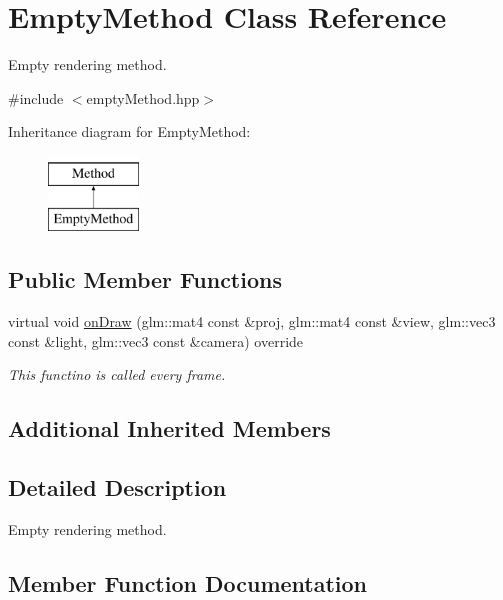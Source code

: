 \hypertarget{classEmptyMethod}{}\section{Empty\+Method Class Reference}
\label{classEmptyMethod}


Empty rendering method.  




{\ttfamily \#include $<$empty\+Method.\+hpp$>$}

Inheritance diagram for Empty\+Method\+:\begin{figure}[H]
\begin{center}
\leavevmode
\includegraphics[height=2.000000cm]{classEmptyMethod}
\end{center}
\end{figure}
\subsection*{Public Member Functions}
\begin{DoxyCompactItemize}
\item 
virtual void \hyperlink{classEmptyMethod_a2f0962a5a3c39614b1112c137b0efd62}{on\+Draw} (glm\+::mat4 const \&proj, glm\+::mat4 const \&view, glm\+::vec3 const \&light, glm\+::vec3 const \&camera) override
\begin{DoxyCompactList}\small\item\em This functino is called every frame. \end{DoxyCompactList}\end{DoxyCompactItemize}
\subsection*{Additional Inherited Members}


\subsection{Detailed Description}
Empty rendering method. 

\subsection{Member Function Documentation}
\mbox{\label{classEmptyMethod_a2f0962a5a3c39614b1112c137b0efd62}} 
